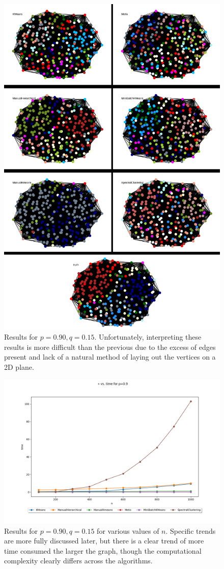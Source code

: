 \documentclass{article}
\begin{document}
\begin{figure}[H]
    \label{fig:results_p-90_q-15}
    \centering
    \includegraphics[width=.85\textwidth]{results/results_p-90_q-15.png}
    \caption[Clustering for $p=0.90,q=0.15$]{Results for $p=0.90,q=0.15$. Unfortunately, interpreting these results is more difficult than the previous due to the excess of edges present and lack of a natural method of laying out the vertices on a 2D plane.}
\end{figure}

\begin{figure}[H]
    \label{fig:cluster_times}
    \centering
    \includegraphics[width=.85\textwidth]{results/cluster_times.png}
    \caption[Clustering times across algorithms $p=0.90,q=0.20$]{Results for $p=0.90,q=0.15$ for various values of $n$. Specific trends are more fully discussed later, but there is a clear trend of more time consumed the larger the graph, though the computational complexity clearly differs across the algorithms.}
\end{figure}
\end{document}

